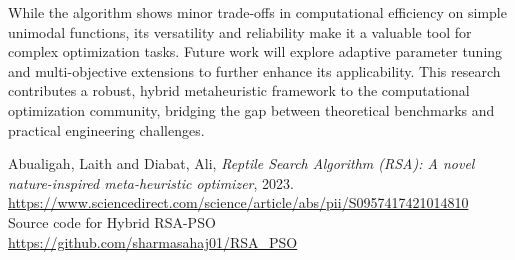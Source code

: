 \documentclass[12pt]{article}
\begin{document}
While the algorithm shows minor trade-offs in computational efficiency on simple unimodal functions, its versatility and reliability make it a valuable tool for complex optimization tasks. Future work will explore adaptive parameter tuning and multi-objective extensions to further enhance its applicability. This research contributes a robust, hybrid metaheuristic framework to the computational optimization community, bridging the gap between theoretical benchmarks and practical engineering challenges.  


\begin{thebibliography}{9}
Abualigah, Laith and Diabat, Ali, \textit{Reptile Search Algorithm (RSA): A novel nature-inspired meta-heuristic optimizer}, 2023. \\
\url{https://www.sciencedirect.com/science/article/abs/pii/S0957417421014810}
Source code for Hybrid RSA-PSO \\
\url{https://github.com/sharmasahaj01/RSA_PSO}
\end{thebibliography}
\end{document}
